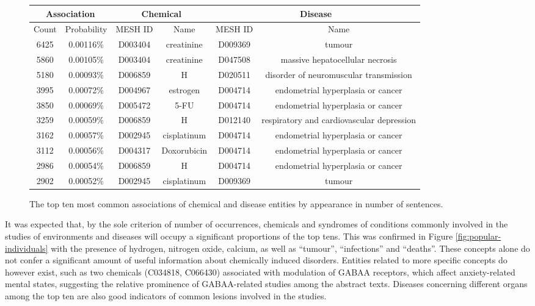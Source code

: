 \documentclass[10pt, oneside]{article}
\begin{document}
\begin{figure}[h]
\begin{center}
\fontsize{9}{11}\selectfont
\begin{tabular}{|*{6}{c|}}\hline
\multicolumn{2}{|c|}{\textbf{Association}} & \multicolumn{2}{c|}{\textbf{Chemical}} & \multicolumn{2}{c|}{\textbf{Disease}} \\ \hline 
Count & Probability & MESH ID & Name & MESH ID & Name \\ \hline 
6425 & 0.00116\% & D003404 & creatinine & D009369 & tumour \\ \hline
5860 & 0.00105\% & D003404 & creatinine & D047508 & massive hepatocellular necrosis \\ \hline
5180 & 0.00093\% & D006859 & H & D020511 & disorder of neuromuscular transmission \\ \hline
3995 & 0.00072\% & D004967 & estrogen & D004714 & endometrial hyperplasia or cancer \\ \hline
3850 & 0.00069\% & D005472 & 5-FU & D004714 & endometrial hyperplasia or cancer \\ \hline
3259 & 0.00059\% & D006859 & H & D012140 & respiratory and cardiovascular depression \\ \hline
3162 & 0.00057\% & D002945 & cisplatinum & D004714 & endometrial hyperplasia or cancer \\ \hline
3112 & 0.00056\% & D004317 & Doxorubicin & D004714 & endometrial hyperplasia or cancer \\ \hline
2986 & 0.00054\% & D006859 & H & D004714 & endometrial hyperplasia or cancer \\ \hline
2902 & 0.00052\% & D002945 & cisplatinum & D009369 & tumour \\ \hline
\end{tabular}
\caption{\label{fig:popular-pairs} The top ten most common associations of chemical and disease entities by appearance in number of sentences.}
\end{center}
\end{figure}

It was expected that, by the sole criterion of number of occurrences, chemicals and syndromes of conditions commonly involved in the studies of environments and diseases will occupy a significant proportions of the top tens. This was confirmed in Figure \ref{fig:popular-individuals} with the presence of hydrogen, nitrogen oxide, calcium, as well as ``tumour'', ``infections'' and ``deaths''. These concepts alone do not confer a significant amount of useful information about chemically induced disorders. Entities related to more specific concepts do however exist, such as two chemicals (C034818, C066430) associated with modulation of GABAA receptors, which affect anxiety-related mental states, suggesting the relative prominence of GABAA-related studies among the abstract texts. Diseases concerning different organs among the top ten are also good indicators of common lesions involved in the studies.
\end{document}
